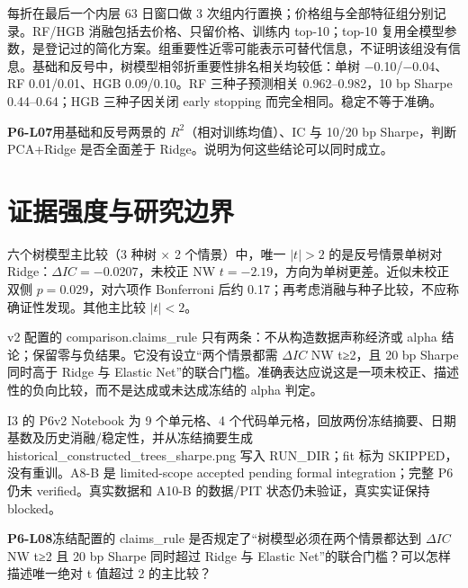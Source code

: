 每折在最后一个内层 63 日窗口做 3 次组内行置换；价格组与全部特征组分别记录。RF/HGB 消融包括去价格、只留价格、训练内 top-10；top-10 复用全模型参数，是登记过的简化方案。组重要性近零可能表示可替代信息，不证明该组没有信息。基础和反号中，树模型相邻折重要性排名相关均较低：单树 −0.10/−0.04、RF 0.01/0.01、HGB 0.09/0.10。RF 三种子预测相关 0.962–0.982，10 bp Sharpe 0.44–0.64；HGB 三种子因关闭 early stopping 而完全相同。稳定不等于准确。

\begin{yourturn}\textbf{P6-L07}\quad 用基础和反号两景的 \(R^2\)（相对训练均值）、IC 与 10/20 bp Sharpe，判断 PCA+Ridge 是否全面差于 Ridge。说明为何这些结论可以同时成立。\workspace[4]\end{yourturn}

\clearpage\section{证据强度与研究边界}
\begin{strand}
六个树模型主比较（3 种树 × 2 个情景）中，唯一 \(|t|>2\) 的是反号情景单树对 Ridge：\(\Delta IC=-0.0207\)，未校正 NW \(t=-2.19\)，方向为单树更差。近似未校正双侧 \(p=0.029\)，对六项作 Bonferroni 后约 0.17；再考虑消融与种子比较，不应称确证性发现。其他主比较 \(|t|<2\)。
\end{strand}
v2 配置的 comparison.claims\_rule 只有两条：不从构造数据声称经济或 alpha 结论；保留零与负结果。它没有设立“两个情景都需 \(\Delta IC\) NW t≥2，且 20 bp Sharpe 同时高于 Ridge 与 Elastic Net”的联合门槛。准确表达应说这是一项未校正、描述性的负向比较，而不是达成或未达成冻结的 alpha 判定。

I3 的 P6v2 Notebook 为 9 个单元格、4 个代码单元格，回放两份冻结摘要、日期基数及历史消融/稳定性，并从冻结摘要生成 historical\_constructed\_trees\_sharpe.png 写入 RUN\_DIR；fit 标为 SKIPPED，没有重训。A8-B 是 limited-scope accepted pending formal integration；完整 P6 仍未 verified。真实数据和 A10-B 的数据/PIT 状态仍未验证，真实实证保持 blocked。

\begin{yourturn}\textbf{P6-L08}\quad 冻结配置的 claims\_rule 是否规定了“树模型必须在两个情景都达到 \(\Delta IC\) NW t≥2 且 20 bp Sharpe 同时超过 Ridge 与 Elastic Net”的联合门槛？可以怎样描述唯一绝对 t 值超过 2 的主比较？\workspace[5]\end{yourturn}

